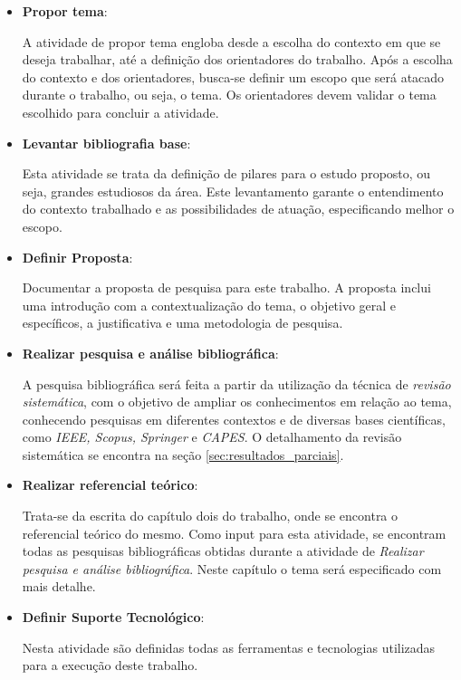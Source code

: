 \begin{itemize}
	\item \textbf{Propor tema}:

		A atividade de propor tema engloba desde a escolha do contexto em que se deseja trabalhar, até a definição dos orientadores do trabalho. Após a escolha do contexto e dos orientadores, busca-se definir um escopo que será atacado durante o trabalho, ou seja, o tema. Os orientadores devem validar o tema escolhido para concluir a atividade.

	\item \textbf{Levantar bibliografia base}:

		Esta atividade se trata da definição de pilares para o estudo proposto, ou seja, grandes estudiosos da área. Este levantamento garante o entendimento do contexto trabalhado e as possibilidades de atuação, especificando melhor o escopo.

	\item \textbf{Definir Proposta}:

		Documentar a proposta de pesquisa para este trabalho. A proposta inclui uma introdução com a contextualização do tema, o objetivo geral e específicos, a justificativa e uma metodologia de pesquisa.

	\item \textbf{Realizar pesquisa e análise bibliográfica}:

		A pesquisa bibliográfica será feita a partir da utilização da técnica de \textit{revisão sistemática}, com o objetivo de ampliar os conhecimentos em relação ao tema, conhecendo pesquisas em diferentes contextos e de diversas bases científicas, como \textit{IEEE, Scopus, Springer} e \textit{CAPES}. O detalhamento da revisão sistemática se encontra na seção \ref{sec:resultados_parciais}.

	\item \textbf{Realizar referencial teórico}:

		Trata-se da escrita do capítulo dois do trabalho, onde se encontra o referencial teórico do mesmo. Como input para esta atividade, se encontram todas as pesquisas bibliográficas obtidas durante a atividade de \textit{Realizar pesquisa e análise bibliográfica}. Neste capítulo o tema será especificado com mais detalhe.

	\item \textbf{Definir Suporte Tecnológico}:

		Nesta atividade são definidas todas as ferramentas e tecnologias utilizadas para a execução deste trabalho. 


\end{itemize}
